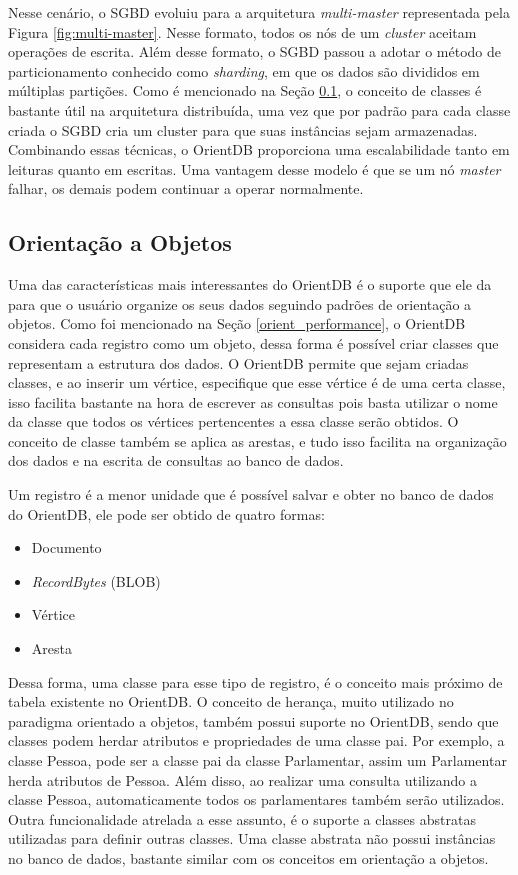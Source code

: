 	Nesse cenário, o SGBD evoluiu para a arquitetura \textit{multi-master} representada pela Figura \ref{fig:multi-master}. Nesse formato, todos os nós de um \textit{cluster} aceitam operações de escrita. Além desse formato, o SGBD passou a adotar o método de particionamento conhecido como \textit{sharding}, em que os dados são divididos em múltiplas partições. Como é mencionado na Seção \ref{orient_object}, o conceito de classes é bastante útil na arquitetura distribuída, uma vez que por padrão para cada classe criada o SGBD cria um cluster para que suas instâncias sejam armazenadas. Combinando essas técnicas, o OrientDB proporciona uma escalabilidade tanto em leituras quanto em escritas. Uma vantagem desse modelo é que se um nó \textit{master} falhar, os demais podem continuar a operar normalmente.

\subsection{Orientação a Objetos} \label{orient_object}

	Uma das características mais interessantes do OrientDB é o suporte que ele da para que o usuário organize os seus dados seguindo padrões de orientação a objetos. Como foi mencionado na Seção \ref{orient_performance}, o OrientDB considera cada registro como um objeto, dessa forma é possível criar classes que representam a estrutura dos dados. O OrientDB permite que sejam criadas classes, e ao inserir um vértice, especifique que esse vértice é de uma certa classe, isso facilita bastante na hora de escrever as consultas pois basta utilizar o nome da classe que todos os vértices pertencentes a essa classe serão obtidos. O conceito de classe também se aplica as arestas, e tudo isso facilita na organização dos dados e na escrita de consultas ao banco de dados.
	
	Um registro é a menor unidade que é possível salvar e obter no banco de dados do OrientDB, ele pode ser obtido de quatro formas:
	
	\begin{itemize}
		\item Documento
		\item \textit{RecordBytes} (BLOB)
		\item Vértice
		\item Aresta
	\end{itemize}
	
	Dessa forma, uma classe para esse tipo de registro, é o conceito mais próximo de tabela existente no OrientDB. O conceito de herança, muito utilizado no paradigma orientado a objetos, também possui suporte no OrientDB, sendo que classes podem herdar atributos e propriedades de uma classe pai. Por exemplo, a classe Pessoa, pode ser a classe pai da classe Parlamentar, assim um Parlamentar herda atributos de Pessoa. Além disso, ao realizar uma consulta utilizando a classe Pessoa, automaticamente todos os parlamentares também serão utilizados. Outra funcionalidade atrelada a esse assunto, é o suporte a classes abstratas utilizadas para definir outras classes. Uma classe abstrata não possui instâncias no banco de dados, bastante similar com os conceitos em orientação a objetos. 
	
